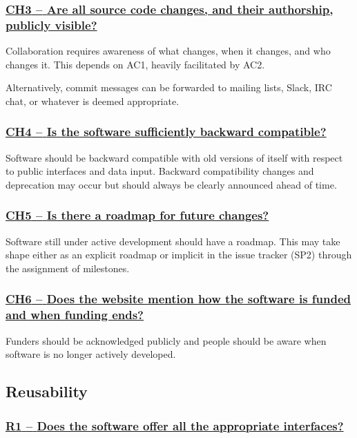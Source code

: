 \documentclass[a4paper,11pt]{article}
\newcommand{\criterion}[1]{\subsubsection*{\underline{#1}}}
\begin{document}
\newcommand{\chThreeID}{CH3}
\newcommand{\chThreeText}{Are all source code changes, and their authorship, publicly visible?}
\criterion{\chThreeID{ }--{ }\chThreeText}\label{id:ch3} 

Collaboration requires awareness of what changes, when it changes, and who
changes it. This depends on AC1, heavily facilitated by AC2.

Alternatively, commit messages can be forwarded to mailing lists, Slack, IRC chat, or
whatever is deemed appropriate.

\newcommand{\chFourID}{CH4}
\newcommand{\chFourText}{Is the software sufficiently backward compatible?}
\criterion{\chFourID{ }--{ }\chFourText}\label{id:ch4} 

Software should be backward compatible with old versions of itself with respect
to public interfaces and data input. Backward compatibility changes and
deprecation may occur but should always be clearly announced ahead of time.

\newcommand{\chFiveID}{CH5}
\newcommand{\chFiveText}{Is there a roadmap for future changes?}
\criterion{\chFiveID{ }--{ }\chFiveText}\label{id:ch5} 

Software still under active development should have a roadmap. This may take
shape either as an explicit roadmap or implicit in the issue tracker
(SP2) through the assignment of milestones.

\newcommand{\chSixID}{CH6}
\newcommand{\chSixText}{Does the website mention how the software is funded and when funding ends?}
\criterion{\chSixID{ }--{ }\chSixText}\label{id:ch6} 

Funders should be acknowledged publicly and people should be aware when
software is no longer actively developed.

\subsection{Reusability}\label{sec:reu}

\newcommand{\rOneID}{R1}
\newcommand{\rOneText}{Does the software offer all the appropriate interfaces?}
\criterion{\rOneID{ }--{ }\rOneText}\label{id:r1} 
\end{document}
